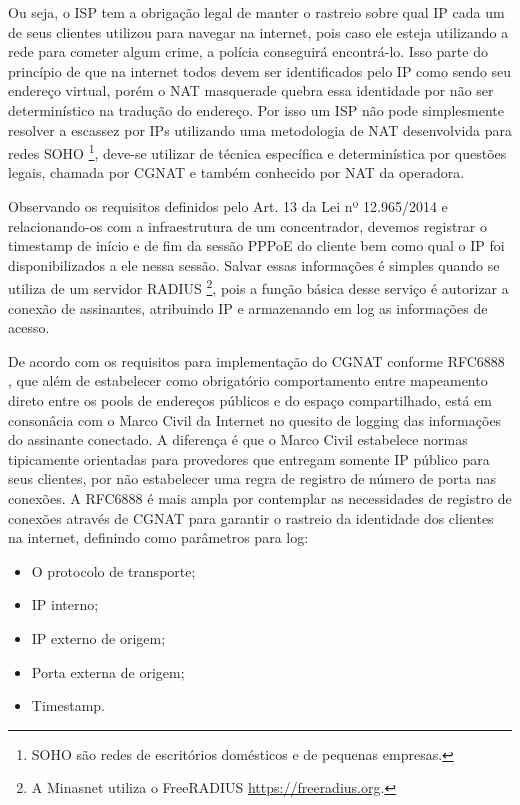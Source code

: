    Ou seja, o ISP tem a obrigação legal de manter o rastreio sobre qual IP cada um de seus clientes utilizou para navegar na internet, pois caso ele esteja utilizando a rede para cometer algum crime, a polícia conseguirá encontrá-lo. Isso parte do princípio de que na internet todos devem ser identificados pelo IP como sendo seu endereço virtual, porém o NAT masquerade quebra essa identidade por não ser determinístico na tradução do endereço. Por isso um ISP não pode simplesmente resolver a escassez por IPs utilizando uma metodologia de NAT desenvolvida para redes SOHO \footnote{SOHO são redes de escritórios domésticos e de pequenas empresas.}, deve-se utilizar de técnica específica e determinística por questões legais, chamada por CGNAT e também conhecido por NAT da operadora.
   
   Observando os requisitos definidos pelo Art. 13 da Lei nº 12.965/2014 e relacionando-os com a infraestrutura de um concentrador, devemos registrar o timestamp de início e de fim da sessão PPPoE do cliente bem como qual o IP foi disponibilizados a ele nessa sessão. Salvar essas informações é simples quando se utiliza de um servidor RADIUS \footnote{A Minasnet utiliza o FreeRADIUS \url{https://freeradius.org}.}, pois a função básica desse serviço é autorizar a conexão de assinantes, atribuindo IP e armazenando em log as informações de acesso.

   De acordo com os requisitos para implementação do CGNAT conforme RFC6888 \cite{rfc6888}, que além de estabelecer como obrigatório comportamento entre mapeamento direto entre os pools de endereços públicos e do espaço compartilhado, está em consonâcia com o Marco Civil da Internet no quesito de logging das informações do assinante conectado. A diferença é que o Marco Civil estabelece normas tipicamente orientadas para provedores que entregam somente IP público para seus clientes, por não estabelecer uma regra de registro de número de porta nas conexões. A RFC6888 é mais ampla por contemplar as necessidades de registro de conexões através de CGNAT para garantir o rastreio da identidade dos clientes na internet, definindo como parâmetros para log:
   
   \begin{itemize}
       \item O protocolo de transporte;
       \item IP interno;
       \item IP externo de origem;
       \item Porta externa de origem;
       \item Timestamp.
   \end{itemize}

